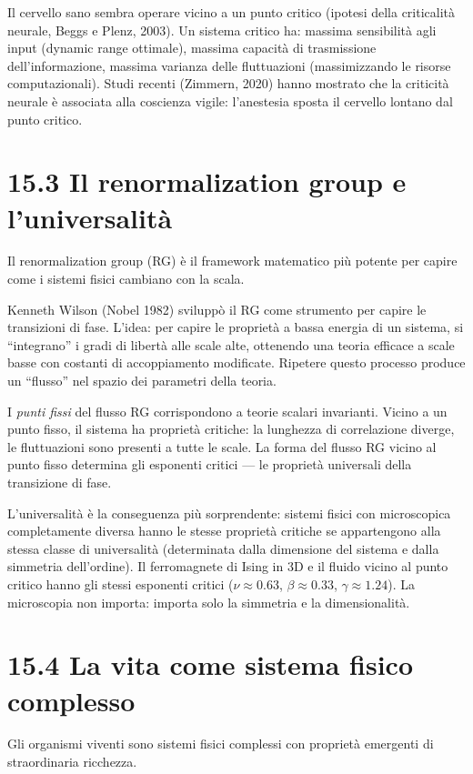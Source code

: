 \documentclass[11.5pt,a4paper,openany]{book}
\theoremstyle{remark}
\begin{document}
Il cervello sano sembra operare vicino a un punto critico (ipotesi della criticalità neurale, Beggs e Plenz, 2003). Un sistema critico ha: massima sensibilità agli input (dynamic range ottimale), massima capacità di trasmissione dell'informazione, massima varianza delle fluttuazioni (massimizzando le risorse computazionali). Studi recenti (Zimmern, 2020) hanno mostrato che la criticità neurale è associata alla coscienza vigile: l'anestesia sposta il cervello lontano dal punto critico.

\section{15.3 Il renormalization group e l'universalità}

Il renormalization group (RG) è il framework matematico più potente per capire come i sistemi fisici cambiano con la scala.

Kenneth Wilson (Nobel 1982) sviluppò il RG come strumento per capire le transizioni di fase. L'idea: per capire le proprietà a bassa energia di un sistema, si ``integrano'' i gradi di libertà alle scale alte, ottenendo una teoria efficace a scale basse con costanti di accoppiamento modificate. Ripetere questo processo produce un ``flusso'' nel spazio dei parametri della teoria.

I \textit{punti fissi} del flusso RG corrispondono a teorie scalari invarianti. Vicino a un punto fisso, il sistema ha proprietà critiche: la lunghezza di correlazione diverge, le fluttuazioni sono presenti a tutte le scale. La forma del flusso RG vicino al punto fisso determina gli esponenti critici --- le proprietà universali della transizione di fase.

L'universalità è la conseguenza più sorprendente: sistemi fisici con microscopica completamente diversa hanno le stesse proprietà critiche se appartengono alla stessa classe di universalità (determinata dalla dimensione del sistema e dalla simmetria dell'ordine). Il ferromagnete di Ising in 3D e il fluido vicino al punto critico hanno gli stessi esponenti critici ($\nu \approx 0.63$, $\beta \approx 0.33$, $\gamma \approx 1.24$). La microscopia non importa: importa solo la simmetria e la dimensionalità.

\section{15.4 La vita come sistema fisico complesso}

Gli organismi viventi sono sistemi fisici complessi con proprietà emergenti di straordinaria ricchezza.
\end{document}
